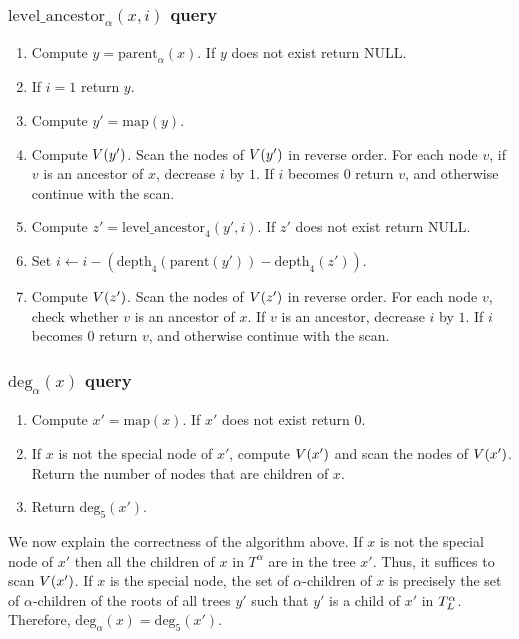 \documentclass[12pt]{article}
\newcommand{\NULL}{\mathrm{NULL}}
\newcommand{\depthb}{\mathrm{depth}}
\newcommand{\parentb}{\mathrm{parent}}
\newcommand{\levelancestorb}{\mathrm{level\_ancestor}}
\newcommand{\Degb}{\mathrm{deg}}
\newcommand{\depth}[2]{\depthb_{#1}(#2)}
\newcommand{\parent}[2]{\parentb_{#1}(#2)}
\newcommand{\levelancestor}[3]{\levelancestorb_{#1}(#2,#3)}
\newcommand{\Deg}[2]{\Degb_{#1}(#2)}
\newcommand{\parentx}[1]{\parentb(#1)}
\newcommand{\idxeq}{4}
\newcommand{\idxchildren}{5}
\newcommand{\map}[1]{\mathrm{map}(#1)}
\begin{document}
\subsubsection{$\levelancestor{\alpha}{x}{i}$ query}
\begin{enumerate}
\item
Compute $y = \parent{\alpha}{x}$.
If $y$ does not exist return $\NULL$.
\item
If $i=1$ return $y$.
\item
Compute $y' = \map{y}$.
\item
Compute $V(y')$. Scan the nodes of $V(y')$ in reverse order.
For each node $v$, if $v$ is an ancestor of $x$, decrease $i$ by $1$.
If $i$ becomes $0$ return $v$, and otherwise continue with the scan.
\item
Compute $z' = \levelancestor{\idxeq}{y'}{i}$.
If $z'$ does not exist return $\NULL$.
\item
Set $i \gets i-(\depth{\idxeq}{\parentx{y'}}-\depth{\idxeq}{z'})$.
\item
Compute $V(z')$. Scan the nodes of $V(z')$ in reverse order.
For each node $v$, check whether $v$ is an ancestor of $x$.
If $v$ is an ancestor, decrease $i$ by $1$.
If $i$ becomes $0$ return $v$, and otherwise continue with the scan.
\end{enumerate}

\subsubsection{$\Deg{\alpha}{x}$ query}
\begin{enumerate}
\item
Compute $x' = \map{x}$.
If $x'$ does not exist return $0$.
\item
If $x$ is not the special node of $x'$,
compute $V(x')$ and scan the nodes of $V(x')$.
Return the number of nodes that are children of $x$.
\item
Return $\Deg{\idxchildren}{x'}$.
\end{enumerate}

We now explain the correctness of the algorithm above.
If $x$ is not the special node of $x'$ then all the children of $x$
in $T^\alpha$ are in the tree $x'$. Thus, it suffices to scan $V(x')$.
If $x$ is the special node, the set of $\alpha$-children of $x$ is
precisely the set of $\alpha$-children of the roots of all trees $y'$
such that $y'$ is a child of $x'$ in $T^\alpha_{L}$.
Therefore, $\Deg{\alpha}{x}=\Deg{\idxchildren}{x'}$.
\end{document}
